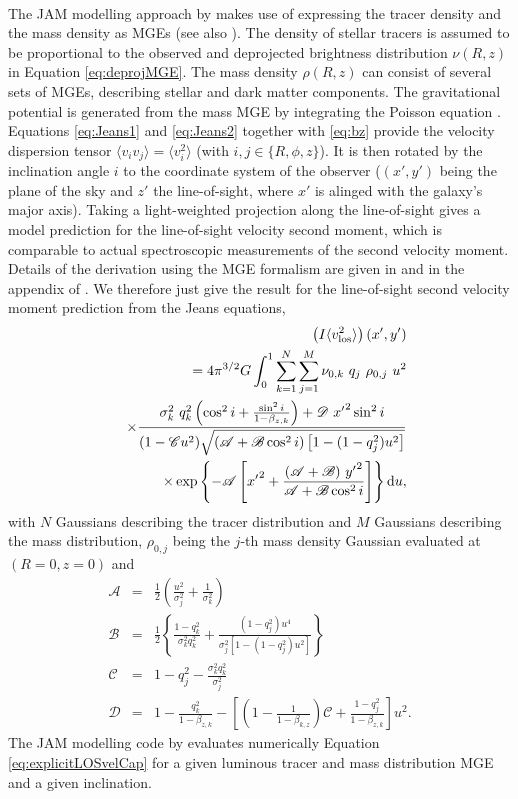 \\The JAM modelling approach by \citet{Cap08} makes use of expressing the tracer density and the mass density as MGEs (see also \citet{1994A&A...285..723E}). The density of stellar tracers is assumed to be proportional to the observed and deprojected brightness distribution $\nu(R,z)$ in Equation \ref{eq:deprojMGE}. The mass density $\rho(R,z)$ can consist of several sets of MGEs, describing stellar and dark matter components. The gravitational potential is generated from the mass MGE by integrating the Poisson equation \citep{1994A&A...285..723E}. Equations \ref{eq:Jeans1} and \ref{eq:Jeans2} together with \ref{eq:bz} provide the velocity dispersion tensor $\langle v_i v_j \rangle = \langle v_i^2 \rangle$ (with $i,j \in \{ R,\phi, z\}$). It is then rotated by the inclination angle $i$ to the coordinate system of the observer ($(x',y')$ being the plane of the sky and $z'$ the line-of-sight, where $x'$ is alinged with the galaxy's major axis). Taking a light-weighted projection along the line-of-sight gives a model prediction for the line-of-sight velocity second moment, which is comparable to actual spectroscopic measurements of the second velocity moment. Details of the derivation using the MGE formalism are given in \citet{Cap08} and in the appendix of \citet{GlennEC}. We therefore just give the result for the line-of-sight second velocity moment prediction from the Jeans equations,
\begin{eqnarray}
&&\left(I \langle v_\text{los}^2\rangle\right)(x',y')\nonumber\\
&&= 4 \pi^{3/2} G \int_0^1 \sum_{k=1}^N \sum_{j=1}^M \nu_{0,k} \ q_j \ \rho_{0,j} \ u^2\nonumber\\
&& \times \frac{\sigma_k^2 \ q^{2}_k \left( \cos^2 i + \frac{\sin^2 i}{1-\beta_{z,k}}\right) + \mathscr{D} \  {x'}^{2} \sin^2 i}{(1-\mathscr{C}u^2) \sqrt{(\mathscr{A} + \mathscr{B} \cos^2 i) \left[1-(1-q^{2}_j) u^2 \right]}}\nonumber\\
&& \times \exp\left\{- \mathscr{A} \left[{x'}^{2} + \frac{(\mathscr{A}+\mathscr{B}) \ {y'}^{2}}{\mathscr{A}+\mathscr{B}\cos^2 i}\right] \right\} \diff u, \label{eq:explicitLOSvelCap}
\end{eqnarray}
with $N$ Gaussians describing the tracer distribution and $M$ Gaussians describing the mass distribution, $\rho_{0,j}$ being the $j$-th mass density Gaussian evaluated at $(R=0,z=0)$ and
\begin{eqnarray*}
\mathscr{A} &=& \frac 12 \left(\frac{u^2}{\sigma_j^2} + \frac{1}{\sigma_k^2} \right)\nonumber\\
\mathscr{B} &=& \frac 12 \left\{\frac{1-q^{2}_k}{\sigma_k^2 q^{2}_k} + \frac{(1-q^{2}_j)u^4}{\sigma_j^2 \left[1-(1-{q}_j^{2})u^2 \right]} \right\}\nonumber\\
\mathscr{C} &=& 1- q^{2}_j - \frac{\sigma_k^2 q^{2}_k}{\sigma^2_j}\nonumber\\
\mathscr{D} &=& 1 - \frac{q^{2}_k}{1-\beta_{z,k}} - \left[ \left(1-\frac{1}{1-\beta_{k,z}}\right)\mathscr{C} + \frac{1-q^{2}_j}{1-\beta_{z,k}}\right] u^2.\nonumber
\end{eqnarray*}
The JAM modelling code by \citet{Cap08} evaluates numerically Equation \ref{eq:explicitLOSvelCap} for a given luminous tracer and mass distribution MGE and a given inclination.


